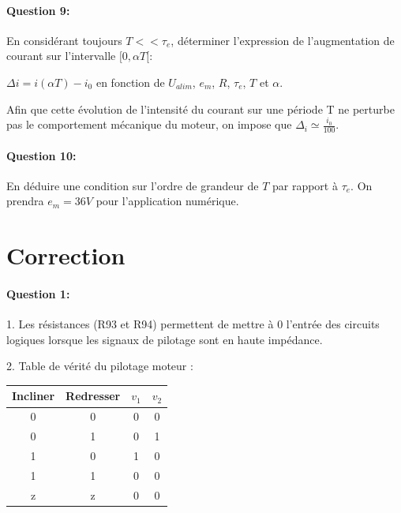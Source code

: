 \paragraph{Question 9:}

En considérant toujours $T << \tau_e$, déterminer l'expression de l'augmentation de courant sur l'intervalle $[0, \alpha T[$:

$\Delta i =i(\alpha T)-i_0$  en fonction de $U_{alim}$, $e_m$, $R$, $\tau_e$, $T$ et $\alpha$.

Afin que cette évolution de l'intensité du courant sur une période T ne perturbe pas le comportement
mécanique du moteur, on impose que $\Delta_i \simeq \frac{i_0}{100}$.

\paragraph{Question 10:}

En déduire une condition sur l'ordre de grandeur de $T$ par rapport à $\tau_e$. On prendra $e_m=36V$ pour l'application numérique.

\ifdef{\public}{}

\newpage

\pagestyle{correction}

\section{Correction}

\paragraph{Question 1:} 

1. Les résistances (R93 et R94) permettent de mettre à 0 l'entrée des circuits logiques lorsque les signaux de pilotage sont en haute impédance.

2. Table de vérité du pilotage moteur :

\begin{center}
\begin{tabular}{|c|c|c|c|}
\hline
Incliner & Redresser & $v_1$ & $v_2$ \\
\hline
0 & 0 & 0 & 0 \\
\hline
0 & 1 & 0 & 1 \\
\hline
1 & 0 & 1 & 0 \\
\hline
1 & 1 & 0 & 0 \\
\hline
z & z & 0 & 0 \\
\hline
\end{tabular}
\end{center}

